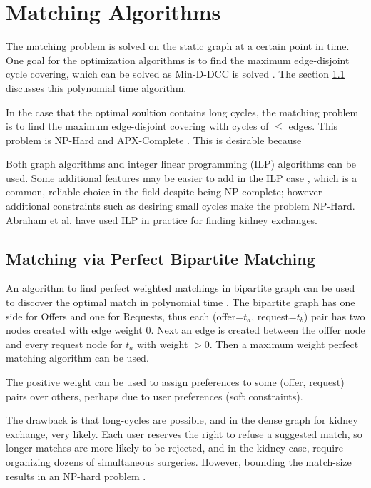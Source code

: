 \documentclass[main.tex]{subfiles}
\begin{document}
\section{Matching Algorithms}
The matching problem is solved on the static graph at a certain point in time. One goal for the optimization algorithms is to find the maximum edge-disjoint cycle covering, which can be solved as Min-D-DCC is solved \cite{Man1} \cite{Bir}. The section \ref{bima} discusses this polynomial time algorithm.

In the case that the optimal soultion contains long cycles, the matching problem is to find the maximum edge-disjoint covering with cycles of $\leq$ edges. This problem is NP-Hard and APX-Complete \cite{Bir}. This is desirable because

Both graph algorithms and integer linear programming (ILP) algorithms can be used. Some additional features may be easier to add in the ILP case , which is a common, reliable choice in the field despite being NP-complete; however additional constraints such as desiring small cycles make the problem NP-Hard. Abraham et al. \cite{Abr1} have used ILP in practice for finding kidney exchanges.

\subsection{Matching via Perfect Bipartite Matching}\label{bima}

An algorithm to find perfect weighted matchings in bipartite graph can be used to discover the optimal match in polynomial time \cite{Bir}. The bipartite graph has one side for Offers and one for Requests, thus each (offer=$t_a$, request=$t_b$) pair has two nodes created with edge weight $0$. Next an edge is created between the offfer node and every request node for $t_a$ with weight $> 0$. Then a maximum weight perfect matching algorithm can be used.

The positive weight can be used to assign preferences to some (offer, request) pairs over others, perhaps due to user preferences (soft constraints).

The drawback is that long-cycles are possible, and in the dense graph for kidney exchange, very likely. Each user reserves the right to refuse a suggested match, so longer matches are more likely to be rejected, and in the kidney case, require organizing dozens of simultaneous surgeries. However, bounding the match-size results in an NP-hard problem \cite{Bir}.
\end{document}
